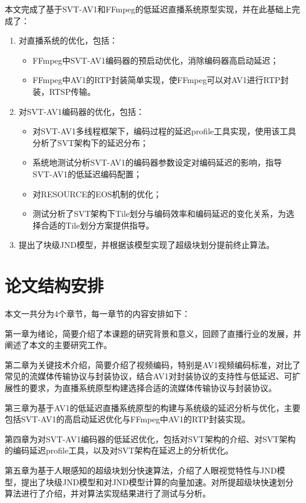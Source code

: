 本文完成了基于SVT-AV1和FFmpeg的低延迟直播系统原型实现，并在此基础上完成了：
\begin{enumerate} [label=\arabic*)]
    \item 对直播系统的优化，包括：
        \begin{itemize}
            \item FFmpeg中SVT-AV1编码器的预启动优化，消除编码器高启动延迟；
            \item FFmpeg中AV1的RTP封装简单实现，使FFmpeg可以对AV1进行RTP封装，RTSP传输。
        \end{itemize}
    \item 对SVT-AV1编码器的优化，包括：
        \begin{itemize}
            \item 对SVT-AV1多线程框架下，编码过程的延迟profile工具实现，使用该工具分析了SVT架构下的延迟分布；
            \item 系统地测试分析SVT-AV1的编码器参数设定对编码延迟的影响，指导SVT-AV1的低延迟编码配置；
            \item 对RESOURCE的EOS机制的优化；
            \item 测试分析了SVT架构下Tile划分与编码效率和编码延迟的变化关系，为选择合适的Tile划分方案提供指导。
        \end{itemize}
    \item 提出了块级JND模型，并根据该模型实现了超级块划分提前终止算法。
\end{enumerate}

\section{论文结构安排}

本文一共分为4个章节，每一章节的内容安排如下：

第一章为绪论，简要介绍了本课题的研究背景和意义，回顾了直播行业的发展，并阐述了本文的主要研究工作。

第二章为关键技术介绍，简要介绍了视频编码，特别是AV1视频编码标准，对比了常见的流媒体传输协议与封装协议，结合AV1对封装协议的支持性与低延迟、可扩展性的要求，为直播系统原型构建选择合适的流媒体传输协议与封装协议。

第三章为基于AV1的低延迟直播系统原型的构建与系统级的延迟分析与优化，主要包括SVT-AV1的高启动延迟优化与FFmpeg中AV1的RTP封装实现。

第四章为对SVT-AV1编码器的低延迟优化，包括对SVT架构的介绍、对SVT架构的编码延迟profile工具，以及对SVT架构在延迟上的分析优化。

第五章为基于人眼感知的超级块划分快速算法，介绍了人眼视觉特性与JND模型，提出了块级JND模型和对JND模型计算的向量加速。对所提超级块快速划分算法进行了介绍，并对算法实现结果进行了测试与分析。
